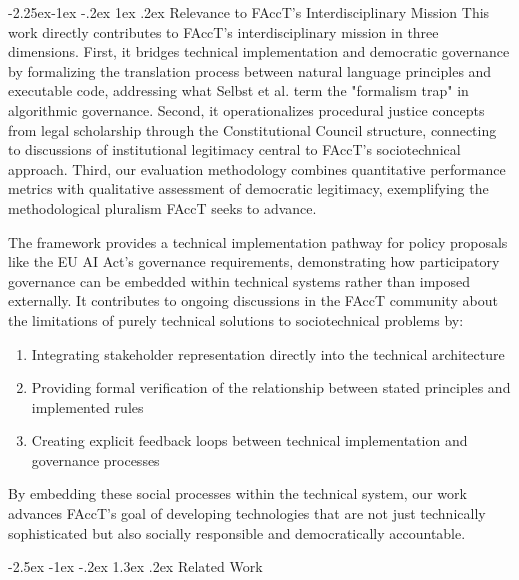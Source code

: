 \documentclass[manuscript,screen,review,anonymous,9pt]{acmart}
\makeatletter
\renewcommand\section{\@startsection{section}{1}{\z@}%
  {-2.5ex \@plus -1ex \@minus -.2ex}%
  {1.3ex \@plus.2ex}%
  {\normalfont\Large\bfseries}}
\renewcommand\subsection{\@startsection{subsection}{2}{\z@}%
  {-2.25ex\@plus -1ex \@minus -.2ex}%
  {1ex \@plus .2ex}%
  {\normalfont\large\bfseries}}
\makeatother
\begin{document}
\subsection{Relevance to FAccT's Interdisciplinary Mission}
\label{subsec:facct_relevance}
This work directly contributes to FAccT's interdisciplinary mission in three dimensions. First, it bridges technical implementation and democratic governance by formalizing the translation process between natural language principles and executable code, addressing what Selbst et al. \cite{Selbst2019FairnessAccountability} term the "formalism trap" in algorithmic governance. Second, it operationalizes procedural justice concepts from legal scholarship through the Constitutional Council structure, connecting to discussions of institutional legitimacy central to FAccT's sociotechnical approach. Third, our evaluation methodology combines quantitative performance metrics with qualitative assessment of democratic legitimacy, exemplifying the methodological pluralism FAccT seeks to advance.

The framework provides a technical implementation pathway for policy proposals like the EU AI Act's governance requirements, demonstrating how participatory governance can be embedded within technical systems rather than imposed externally. It contributes to ongoing discussions in the FAccT community about the limitations of purely technical solutions to sociotechnical problems by:

\begin{enumerate}
    \item Integrating stakeholder representation directly into the technical architecture
    \item Providing formal verification of the relationship between stated principles and implemented rules
    \item Creating explicit feedback loops between technical implementation and governance processes
\end{enumerate}

By embedding these social processes within the technical system, our work advances FAccT's goal of developing technologies that are not just technically sophisticated but also socially responsible and democratically accountable.

\section{Related Work}
\label{sec:related_work}
\end{document}
